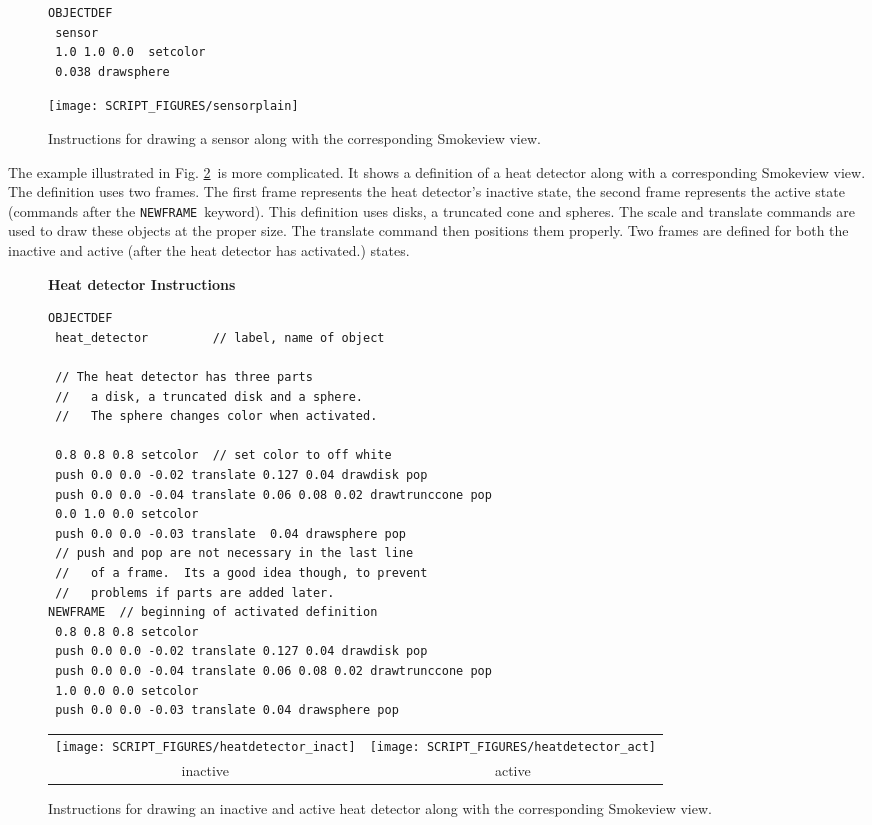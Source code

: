 \documentclass[11pt,twoside]{book}
\begin{document}
\begin{figure}[bph]
{\small
\begin{lstlisting}[frame=single,rulecolor=\color{yellow},
framerule=1pt,framesep=1pc,fillcolor=\color{yellow}]
OBJECTDEF
 sensor
 1.0 1.0 0.0  setcolor
 0.038 drawsphere
\end{lstlisting}
}
\begin{center}
\texttt{[image: SCRIPT\_FIGURES/sensorplain]}\\
\end{center}
\caption{Instructions for drawing a sensor along with the corresponding Smokeview view.}
\label{figsensor}%
\end{figure}

The example illustrated in Fig. \ref{figsprinkler}\ is more complicated.
It shows a definition of a heat detector along with a corresponding
Smokeview view. The definition uses two frames. The first frame represents
the heat detector's inactive state, the second frame represents the active
state (commands after the {\tt NEWFRAME}\ keyword). This definition uses
disks, a truncated cone and spheres. The scale and translate commands are
used to draw these objects at the proper size. The translate command then
positions them properly.  Two frames are defined for both the inactive and
active (after the heat detector has activated.) states.

\begin{figure}[bph]
{\bf Heat detector Instructions}\\
{\small
\begin{lstlisting}[frame=single,rulecolor=\color{yellow},
framerule=1pt,framesep=1pc,fillcolor=\color{yellow}]
OBJECTDEF
 heat_detector         // label, name of object

 // The heat detector has three parts
 //   a disk, a truncated disk and a sphere.
 //   The sphere changes color when activated.

 0.8 0.8 0.8 setcolor  // set color to off white
 push 0.0 0.0 -0.02 translate 0.127 0.04 drawdisk pop
 push 0.0 0.0 -0.04 translate 0.06 0.08 0.02 drawtrunccone pop
 0.0 1.0 0.0 setcolor
 push 0.0 0.0 -0.03 translate  0.04 drawsphere pop
 // push and pop are not necessary in the last line
 //   of a frame.  Its a good idea though, to prevent
 //   problems if parts are added later.
NEWFRAME  // beginning of activated definition
 0.8 0.8 0.8 setcolor
 push 0.0 0.0 -0.02 translate 0.127 0.04 drawdisk pop
 push 0.0 0.0 -0.04 translate 0.06 0.08 0.02 drawtrunccone pop
 1.0 0.0 0.0 setcolor
 push 0.0 0.0 -0.03 translate 0.04 drawsphere pop
\end{lstlisting}
}
\begin{center}
\begin{tabular}{cc}
 \texttt{[image: SCRIPT\_FIGURES/heatdetector\_inact]}&
 \texttt{[image: SCRIPT\_FIGURES/heatdetector\_act]}\\
inactive&active\\
 \end{tabular}
 \end{center}
\caption{Instructions for drawing an inactive and active heat detector
along with the corresponding Smokeview view.}
\label{figsprinkler}%
\end{figure}
\end{document}
